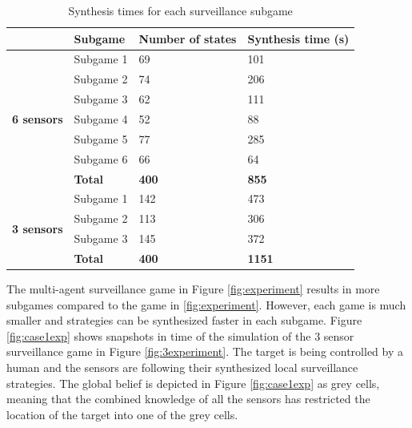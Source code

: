 \begin{table}[h!]
\vspace{-0.2cm}
	\centering
	\caption{Synthesis times for each surveillance subgame}
	\label{tab:synthtime}
	\begin{tabular}{c|l|l|l}
		\multicolumn{1}{l|}{}                                    & \textbf{Subgame} & \textbf{Number of states} & \textbf{Synthesis time (s)} \\ \hline \hline
		\multirow{7}{*}{\textbf{6 sensors}}
		& Subgame 1   & 69     & 101                          \\
	    & Subgame 2   & 74     & 206                          \\
		& Subgame 3   & 62     & 111                          \\
		& Subgame 4   & 52     & 88                          \\
		& Subgame 5   & 77     & 285                          \\
		& Subgame 6   & 66     & 64                          \\ \hline
		& \textbf{Total}   & \textbf{400}         & \textbf{855}                         \\ \hline
		\multicolumn{1}{l|}{\multirow{4}{*}{\textbf{3 sensors}}} & Subgame 1        & 142 & 473                         \\
		\multicolumn{1}{l|}{}                                    & Subgame 2        & 113 & 306                         \\
		\multicolumn{1}{l|}{}                                    & Subgame 3        & 145 & 372                         \\ \hline
		\multicolumn{1}{l|}{}                                    &  \textbf{Total} & \textbf{400}            & \textbf{1151}                        
	\end{tabular}
\end{table}
\vspace{-0.2cm}
The multi-agent surveillance game in Figure \ref{fig:experiment} results in more subgames compared to the game in \ref{fig:experiment}. However, each game is much smaller and strategies can be synthesized faster in each subgame. Figure \ref{fig:case1exp} shows snapshots in time of the simulation of the 3 sensor surveillance game in Figure \ref{fig:3experiment}. The target is being controlled by a human and the sensors are following their synthesized local surveillance strategies. The global belief is depicted in Figure \ref{fig:case1exp} as grey cells, meaning that the combined knowledge of all the sensors has restricted the location of the target into one of the grey cells.

